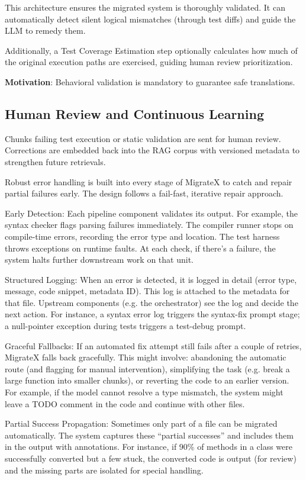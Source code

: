 \documentclass[twocolumn]{article}
\begin{document}
    This architecture ensures the migrated system is thoroughly validated. It can automatically detect silent logical mismatches (through test diffs) and guide the LLM to remedy them.

Additionally, a {Test Coverage Estimation} step optionally calculates how much of the original execution paths are exercised, guiding human review prioritization.

\textbf{Motivation}: Behavioral validation is mandatory to guarantee safe translations.

\subsection{Human Review and Continuous Learning}

Chunks failing test execution or static validation are sent for human review. Corrections are embedded back into the RAG corpus with versioned metadata to strengthen future retrievals.

Robust error handling is built into every stage of MigrateX to catch and repair partial failures early. The design follows a fail-fast, iterative repair approach.

{Early Detection}: Each pipeline component validates its output. For example, the syntax checker flags parsing failures immediately. The compiler runner stops on compile-time errors, recording the error type and location. The test harness throws exceptions on runtime faults. At each check, if there’s a failure, the system halts further downstream work on that unit.
    
{Structured Logging}: When an error is detected, it is logged in detail (error type, message, code snippet, metadata ID). This log is attached to the metadata for that file. Upstream components (e.g. the orchestrator) see the log and decide the next action. For instance, a syntax error log triggers the syntax-fix prompt stage; a null-pointer exception during tests triggers a test-debug prompt.

{Graceful Fallbacks}: If an automated fix attempt still fails after a couple of retries, MigrateX falls back gracefully. This might involve: abandoning the automatic route (and flagging for manual intervention), simplifying the task (e.g. break a large function into smaller chunks), or reverting the code to an earlier version. For example, if the model cannot resolve a type mismatch, the system might leave a TODO comment in the code and continue with other files.

{Partial Success Propagation}: Sometimes only part of a file can be migrated automatically. The system captures these ``partial successes'' and includes them in the output with annotations. For instance, if 90\% of methods in a class were successfully converted but a few stuck, the converted code is output (for review) and the missing parts are isolated for special handling.
\end{document}

